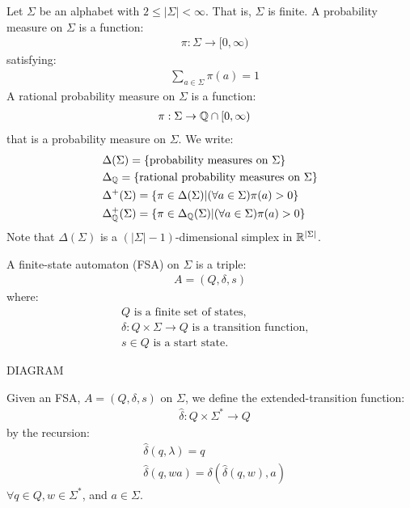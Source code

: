 \documentclass[../main.tex]{subfiles}
\begin{document}
Let $\Sigma$ be an alphabet with $2 \leq |\Sigma| < \infty$. That is, $\Sigma$
is finite.
A probability measure on $\Sigma$ is a function: 
\begin{align*}
    & \pi: \Sigma \rightarrow [0, \infty)
\end{align*}
satisfying:
\begin{align*}
    & \sum_{a \in \Sigma} \pi(a) = 1
\end{align*}
A rational probability measure on $\Sigma$ is a function:
\begin{align*}
    & \pi: \Sigma \rightarrow \mathbb{Q} \cap [0, \infty)
\end{align*}
that is a probability measure on $\Sigma$.
We write:
\begin{align*}
    & \Delta(\Sigma) = \{ \text{probability measures on $\Sigma$} \} \\
    & \Delta_{\mathbb{Q}} = \{ \text{rational probability measures on $\Sigma$} \} \\
    & \Delta^{+}(\Sigma) = \{ \pi \in \Delta(\Sigma) | (\forall a \in \Sigma) \pi(a) > 0 \} \\
    & \Delta^{+}_{\mathbb{Q}}(\Sigma) = \{ \pi \in \Delta_{\mathbb{Q}}(\Sigma) | (\forall a \in \Sigma) \pi(a) > 0 \} \\
\end{align*}
Note that $\Delta(\Sigma)$ is a $(|\Sigma| - 1)$-dimensional simplex in $\mathbb{R}^{|\Sigma|}$.

\begin{defn}
    A finite-state automaton (FSA) on $\Sigma$ is a triple:
    \begin{align*}
        A = (Q, \delta, s)
    \end{align*}
    where:
    \begin{align*}
        & Q \text{ is a finite set of states,} \\
        & \delta:Q\times\Sigma \rightarrow Q \text{ is a transition function,} \\
        & s \in Q \text{ is a start state.}
    \end{align*}
\end{defn}

\begin{exmp}
    DIAGRAM
\end{exmp}

Given an FSA, $A = (Q, \delta, s)$ on $\Sigma$, we define the extended-transition 
function:
\begin{align*}
    & \hat{\delta}:Q\times\Sigma^{*} \rightarrow Q
\end{align*}
by the recursion:
\begin{align*}
    & \hat{\delta}(q, \lambda) = q \\
    & \hat{\delta}(q, wa) = \delta(\hat{\delta}(q, w), a)
\end{align*}
$\forall q \in Q, w \in \Sigma^{*}$, and $a \in \Sigma$.
\end{document}
